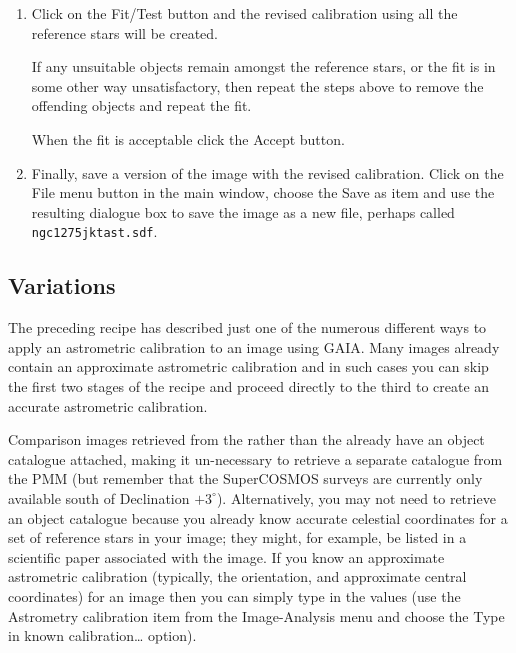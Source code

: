 \documentclass[twoside,11pt]{starlink}
\begin{document}
\begin{enumerate}
  \item Click on the \textsf{Fit/Test} button and the revised calibration
   using all the reference stars will be created.

   If any unsuitable objects remain amongst the reference stars, or the
   fit is in some other way unsatisfactory, then repeat the steps above
   to remove the offending objects and repeat the fit.

   When the fit is acceptable click the \textsf{Accept} button.

  \item Finally, save a version of the image with the revised calibration.
   Click on the \textsf{File} menu button in the main window, choose the \textsf{Save as} item and use the resulting dialogue box to save the image as a
   new file, perhaps called \texttt{ngc1275jktast.sdf}.

\end{enumerate}

\subsection{\label{VARIAT}Variations}

The preceding recipe has described just one of the numerous different
ways to apply an astrometric calibration to an image using GAIA.   Many
images already contain an approximate astrometric calibration and in such
cases you can skip the first two stages of the recipe and proceed directly
to the third to create an accurate astrometric calibration.

Comparison images retrieved from the
rather than the
already have an object catalogue attached, making it un-necessary to
retrieve a separate catalogue from the
 PMM (but remember that
the SuperCOSMOS surveys are currently only available south of Declination
$+3^{\circ}$).  Alternatively, you may not need to retrieve an object
catalogue because you already know accurate celestial coordinates for
a set of reference stars in your image; they might, for example, be
listed in a scientific paper associated with the image.  If you know an
approximate astrometric calibration (typically, the orientation,
 and approximate central coordinates)
for an image then you can simply type in the values (use the \textsf{Astrometry
calibration} item from the \textsf{Image-Analysis} menu and choose the \textsf{Type in known calibration\ldots} option).
\end{document}
